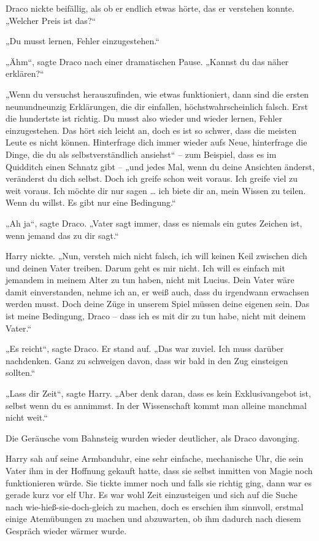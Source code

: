{Draco nickte beifällig, als ob er endlich etwas hörte, das er verstehen konnte. „Welcher Preis ist das?“

„Du musst lernen, Fehler einzugestehen.“

„Ähm“, sagte Draco nach einer dramatischen Pause. „Kannst du das näher erklären?“

„Wenn du versuchst herauszufinden, wie etwas funktioniert, dann sind die ersten neunundneunzig Erklärungen, die dir einfallen, höchstwahrscheinlich falsch. Erst die hundertste ist richtig. Du musst also wieder und wieder lernen, Fehler einzugestehen. Das hört sich leicht an, doch es ist so schwer, dass die meisten Leute es nicht können. Hinterfrage dich immer wieder aufs Neue, hinterfrage die Dinge, die du als selbstverständlich ansiehst“ -- zum Beispiel, dass es im Quidditch einen Schnatz gibt -- „und jedes Mal, wenn du deine Ansichten änderst, veränderst du dich selbst. Doch ich greife schon weit voraus. Ich greife viel zu weit voraus. Ich möchte dir nur sagen … ich biete dir an, mein Wissen zu teilen. Wenn du willst. Es gibt nur eine Bedingung.“

„Ah ja“, sagte Draco. „Vater sagt immer, dass es niemals ein gutes Zeichen ist, wenn jemand das zu dir sagt.“

Harry nickte. „Nun, versteh mich nicht falsch, ich will keinen Keil zwischen dich und deinen Vater treiben. Darum geht es mir nicht. Ich will es einfach mit jemandem in meinem Alter zu tun haben, nicht mit Lucius. Dein Vater wäre damit einverstanden, nehme ich an, er weiß auch, dass du irgendwann erwachsen werden musst. Doch deine Züge in unserem Spiel müssen deine eigenen sein. Das ist meine Bedingung, Draco -- dass ich es mit dir zu tun habe, nicht mit deinem Vater.“

„Es reicht“, sagte Draco. Er stand auf. „Das war zuviel. Ich muss darüber nachdenken. Ganz zu schweigen davon, dass wir bald in den Zug einsteigen sollten.“

„Lass dir Zeit“, sagte Harry. „Aber denk daran, dass es kein Exklusivangebot ist, selbst wenn du es annimmst. In der Wissenschaft kommt man alleine manchmal nicht weit.“

Die Geräusche vom Bahnsteig wurden wieder deutlicher, als Draco davonging.

Harry sah auf seine Armbanduhr, eine sehr einfache, mechanische Uhr, die sein Vater ihm in der Hoffnung gekauft hatte, dass sie selbst inmitten von Magie noch funktionieren würde. Sie tickte immer noch und falls sie richtig ging, dann war es gerade kurz vor elf Uhr. Es war wohl Zeit einzusteigen und sich auf die Suche nach wie-hieß-sie-doch-gleich zu machen, doch es erschien ihm sinnvoll, erstmal einige Atemübungen zu machen und abzuwarten, ob ihm dadurch nach diesem Gespräch wieder wärmer wurde.

}

